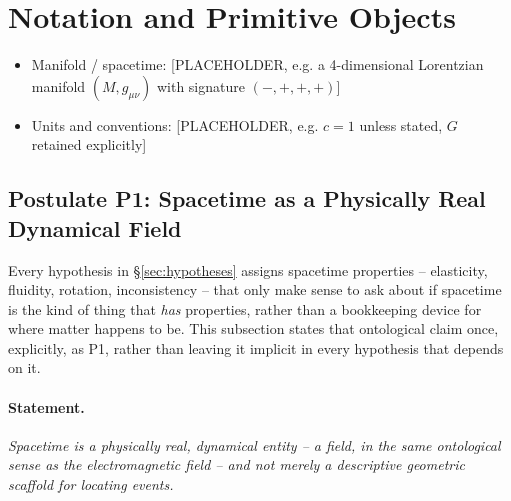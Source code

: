 \documentclass[12pt, a4paper]{article}
\newcommand{\gmunu}{g_{\mu\nu}}
\begin{document}
\section{Notation and Primitive Objects}
\label{sec:notation}

\begin{itemize}
  \item Manifold / spacetime: [PLACEHOLDER, e.g. a 4-dimensional
    Lorentzian manifold $(M, \gmunu)$ with signature $(-,+,+,+)$]
  \item Units and conventions: [PLACEHOLDER, e.g. $c=1$ unless stated,
    $G$ retained explicitly]
\end{itemize}

\subsection{Postulate P1: Spacetime as a Physically Real Dynamical Field}
\label{subsec:p1}
Every hypothesis in \S\ref{sec:hypotheses} assigns spacetime
properties -- elasticity, fluidity, rotation, inconsistency -- that
only make sense to ask about if spacetime is the kind of thing that
\emph{has} properties, rather than a bookkeeping device for where
matter happens to be. This subsection states that ontological claim
once, explicitly, as P1, rather than leaving it implicit in every
hypothesis that depends on it.

\paragraph{Statement.} \emph{Spacetime is a physically real,
dynamical entity -- a field, in the same ontological sense as the
electromagnetic field -- and not merely a descriptive geometric
scaffold for locating events.}
\end{document}
